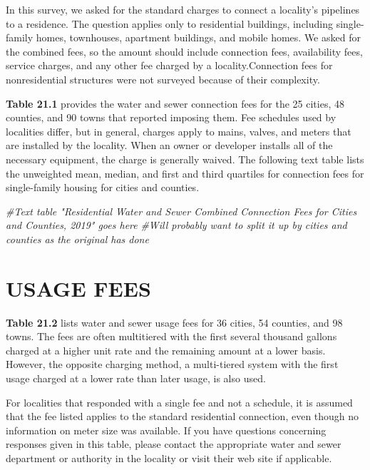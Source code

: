 \documentclass[
]{book}
\newenvironment{Shaded}{\begin{snugshade}}{\end{snugshade}}
\newcommand{\CommentTok}[1]{\textcolor[rgb]{0.56,0.35,0.01}{\textit{#1}}}
\begin{document}
In this survey, we asked for the standard charges to connect a locality's pipelines to a residence. The question applies only to residential buildings, including single-family homes, townhouses, apartment buildings, and mobile homes. We asked for the combined fees, so the amount should include connection fees, availability fees, service charges, and any other fee charged by a locality.Connection fees for nonresidential structures were not surveyed because of their complexity.

\textbf{Table 21.1} provides the water and sewer connection fees for the 25 cities, 48 counties, and 90 towns that reported imposing them. Fee schedules used by localities differ, but in general, charges apply to mains, valves, and meters that are installed by the locality. When an owner or developer installs all of the necessary equipment, the charge is generally waived. The following text table lists the unweighted mean, median, and first and third quartiles for connection fees for single-family housing for cities and counties.

\begin{Shaded}
\begin{Highlighting}[]
\CommentTok{\#Text table "Residential Water and Sewer Combined Connection Fees for Cities and Counties, 2019" goes here }
\CommentTok{\#Will probably want to split it up by cities and counties as the original has done}
\end{Highlighting}
\end{Shaded}

\hypertarget{usage-fees}{%
\section{USAGE FEES}\label{usage-fees}}

\textbf{Table 21.2} lists water and sewer usage fees for 36 cities, 54 counties, and 98 towns. The fees are often multitiered with the first several thousand gallons charged at a higher unit rate and the remaining amount at a lower basis. However, the opposite charging method, a multi-tiered system with the first usage charged at a lower rate than later usage, is also used.

For localities that responded with a single fee and not a schedule, it is assumed that the fee listed applies to the standard residential connection, even though no information on meter size was available. If you have questions concerning responses given in this table, please contact the appropriate water and sewer department or authority in the locality or visit their web site if applicable.
\end{document}
